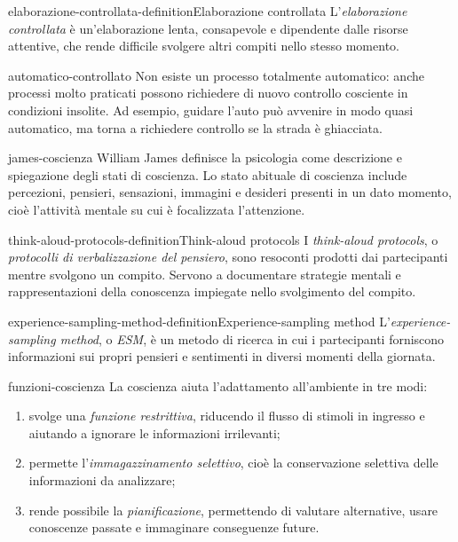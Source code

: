\documentclass[preview]{standalone}
\begin{document}
\begin{snippetdefinition}{elaborazione-controllata-definition}{Elaborazione controllata}
    L'\emph{elaborazione controllata} è un'elaborazione lenta, consapevole e
    dipendente dalle risorse attentive, che rende difficile svolgere altri
    compiti nello stesso momento.
\end{snippetdefinition}

\begin{snippet}{automatico-controllato}
    Non esiste un processo totalmente automatico: anche processi molto praticati
    possono richiedere di nuovo controllo cosciente in condizioni insolite. Ad
    esempio, guidare l'auto può avvenire in modo quasi automatico, ma torna a
    richiedere controllo se la strada è ghiacciata.
\end{snippet}

\begin{snippet}{james-coscienza}
    William James definisce la psicologia come descrizione e spiegazione degli
    stati di coscienza. Lo stato abituale di coscienza include percezioni,
    pensieri, sensazioni, immagini e desideri presenti in un dato momento, cioè
    l'attività mentale su cui è focalizzata l'attenzione.
\end{snippet}

\begin{snippetdefinition}{think-aloud-protocols-definition}{Think-aloud protocols}
    I \emph{think-aloud protocols}, o \emph{protocolli di verbalizzazione del
    pensiero}, sono resoconti prodotti dai partecipanti mentre svolgono un
    compito. Servono a documentare strategie mentali e rappresentazioni della
    conoscenza impiegate nello svolgimento del compito.
\end{snippetdefinition}

\begin{snippetdefinition}{experience-sampling-method-definition}{Experience-sampling method}
    L'\emph{experience-sampling method}, o \emph{ESM}, è un metodo di ricerca
    in cui i partecipanti forniscono informazioni sui propri pensieri e
    sentimenti in diversi momenti della giornata.
\end{snippetdefinition}

\begin{snippet}{funzioni-coscienza}
    La coscienza aiuta l'adattamento all'ambiente in tre modi:
    \begin{enumerate}
        \item svolge una \emph{funzione restrittiva}, riducendo il flusso di
        stimoli in ingresso e aiutando a ignorare le informazioni irrilevanti;
        \item permette l'\emph{immagazzinamento selettivo}, cioè la conservazione
        selettiva delle informazioni da analizzare;
        \item rende possibile la \emph{pianificazione}, permettendo di valutare
        alternative, usare conoscenze passate e immaginare conseguenze future.
    \end{enumerate}
\end{snippet}
\end{document}
